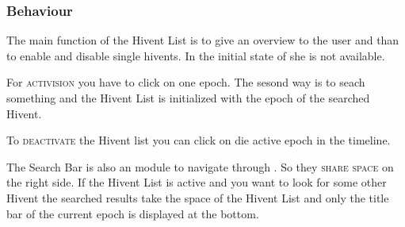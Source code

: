 \subsubsection{Behaviour} %
\label{ssub:behaviour_hl}
The main function of the Hivent List is to give an overview to the user and than to enable and disable single hivents. In the initial state of she is not available. 

For \textsc{activision} you have to click on one epoch. The sesond way is to seach something and the Hivent List is initialized with the epoch of the searched Hivent.

To \textsc{deactivate} the Hivent list you can click on die active epoch in the timeline.

The Search Bar is also an module to navigate through \HG. So they \textsc{share space} on the right side. If the Hivent List is active and you want to look for some other Hivent the searched results take the space of the Hivent List and only the title bar of the current epoch is displayed at the bottom.

